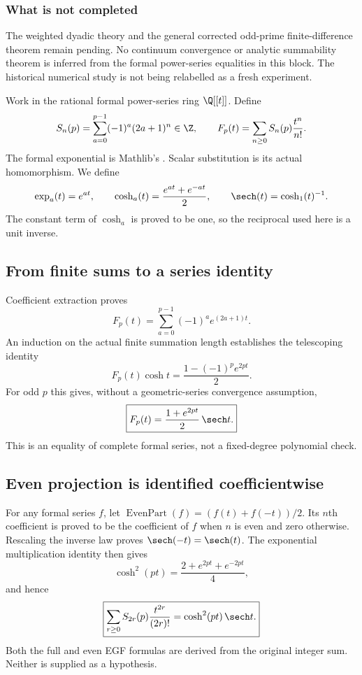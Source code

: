 \subsubsection*{What is not completed}
The weighted dyadic theory and the general corrected odd-prime finite-difference theorem remain pending. No continuum convergence or analytic summability theorem is inferred from the formal power-series equalities in this block. The historical numerical study is not being relabelled as a fresh experiment.
\par\medskip
{}
Work in the rational formal power-series ring $\Q[[t]]$. Define
\[
 S_n(p)=\sum_{a=0}^{p-1}(-1)^a(2a+1)^n\in\Z,
 \qquad F_p(t)=\sum_{n\ge0}S_n(p)\frac{t^n}{n!}.
\]
The formal exponential is Mathlib's . Scalar substitution is its actual  homomorphism. We define
\[
 \exp_a(t)=e^{at},\qquad
 \cosh_a(t)=\frac{e^{at}+e^{-at}}2,\qquad
 \sech(t)=\cosh_1(t)^{-1}.
\]
The constant term of $\cosh_a$ is proved to be one, so the reciprocal used here is a unit inverse.

\subsection*{From finite sums to a series identity}
Coefficient extraction proves
\[
 F_p(t)=\sum_{a=0}^{p-1}(-1)^a e^{(2a+1)t}.
\]
An induction on the actual finite summation length establishes the telescoping identity
\[
 F_p(t)\cosh t=\frac{1-(-1)^p e^{2pt}}2.
\]
For odd $p$ this gives, without a geometric-series convergence assumption,
\[
 \boxed{F_p(t)=\frac{1+e^{2pt}}2\,\sech t.}
\]
This is an equality of complete formal series, not a fixed-degree polynomial check.

\subsection*{Even projection is identified coefficientwise}
For any formal series $f$, let $\operatorname{EvenPart}(f)=(f(t)+f(-t))/2$. Its $n$th coefficient is proved to be the coefficient of $f$ when $n$ is even and zero otherwise. Rescaling the inverse law proves $\sech(-t)=\sech(t)$. The exponential multiplication identity then gives
\[
 \cosh^2(pt)=\frac{2+e^{2pt}+e^{-2pt}}4,
\]
and hence
\[
 \boxed{\sum_{r\ge0}S_{2r}(p)\frac{t^{2r}}{(2r)!}
       =\cosh^2(pt)\,\sech t.}
\]
Both the full and even EGF formulas are derived from the original integer sum. Neither is supplied as a hypothesis.

